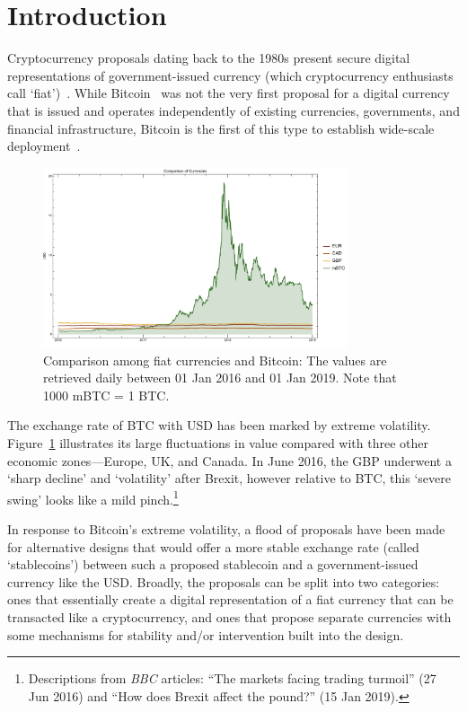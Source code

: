 
\section{Introduction}\label{sec:Intro}

Cryptocurrency proposals dating back to the 1980s present secure digital representations of government-issued currency (which cryptocurrency enthusiasts call `fiat')~\cite{NBFMG16}. While Bitcoin~\cite{nakamoto2008bitcoin} was not the very first proposal for a digital currency that is issued and operates independently of existing currencies, governments, and financial infrastructure, Bitcoin is the first of this type to establish wide-scale deployment~\cite{NaCl17}. 

\begin{figure}[t]
	\centering
	\includegraphics[width=0.8\textwidth]{figures/allCurrencies.pdf}
	\caption{\label{fig:btcandfiat}Comparison among fiat currencies and Bitcoin: The values are retrieved daily between  01 Jan 2016 and 01 Jan 2019. Note that 1000 mBTC = 1 BTC.}
\end{figure}

The exchange rate of BTC with USD has been marked by extreme volatility. Figure~\ref{fig:btcandfiat} illustrates its large fluctuations in value compared with three other economic zones---Europe, UK, and Canada. In June 2016, the GBP underwent a `sharp decline' and `volatility' after Brexit, however relative to BTC, this `severe swing' looks like a mild pinch.\footnote{Descriptions from \textit{BBC} articles: ``The markets facing trading turmoil'' (27 Jun 2016) and ``How does Brexit affect the pound?'' (15 Jan 2019).}

In response to Bitcoin's extreme volatility, a flood of proposals have been made for alternative designs that would offer a more stable exchange rate (called `stablecoins') between such a proposed stablecoin and a government-issued currency like the USD. Broadly, the proposals can be split into two categories: ones that essentially create a digital representation of a fiat currency that can be transacted like a cryptocurrency, and ones that propose separate currencies with some mechanisms for stability and/or intervention built into the design.
	
